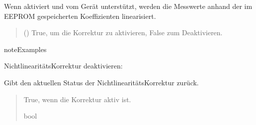 \documentclass[letterpaper,10pt,english]{sphinxmanual}
\begin{document}
\begin{fulllineitems}
\begin{fulllineitems}
\sphinxAtStartPar
Wenn aktiviert und vom Gerät unterstützt, werden die Messwerte
anhand der im EEPROM gespeicherten Koeffizienten linearisiert.
\begin{quote}\begin{description}
\sphinxAtStartPar
{} () \textendash{} True, um die Korrektur zu aktivieren, False zum Deaktivieren.

\end{description}\end{quote}

\begin{sphinxadmonition}{note}{Examples}

\sphinxAtStartPar
Nichtlinearitäts\sphinxhyphen{}Korrektur deaktivieren:

\begin{sphinxVerbatim}[commandchars=\\\{\}]
\end{sphinxVerbatim}
\end{sphinxadmonition}

\end{fulllineitems}


\begin{fulllineitems}
\label{\detokenize{modulab/spectrometer_manager:modules.spectrometer.SpectrometerManager.SpectrometerManager.get_correction_non_linearity}}
\pysigstartsignatures
\pysiglinewithargsret
{}
{}
{}
\pysigstopsignatures
\sphinxAtStartPar
Gibt den aktuellen Status der Nichtlinearitäts\sphinxhyphen{}Korrektur zurück.
\begin{quote}\begin{description}
\sphinxAtStartPar
True, wenn die Korrektur aktiv ist.

\sphinxAtStartPar
bool

\end{description}\end{quote}


\end{fulllineitems}
\end{fulllineitems}
\end{document}
